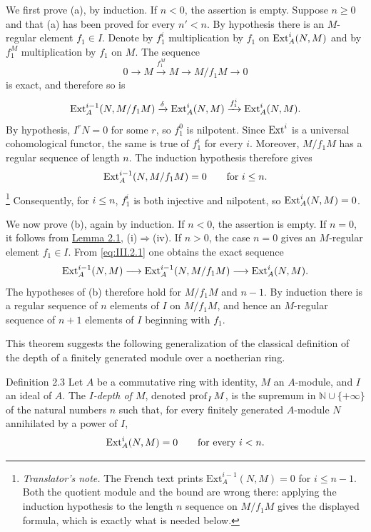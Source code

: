 We first prove (a), by induction. If $n<0$, the assertion is empty. Suppose
$n\ge0$ and that (a) has been proved for every $n'<n$. By hypothesis there
is an $M$-regular element $f_1\in I$. Denote by $f_1^i$ multiplication by
$f_1$ on $\operatorname{Ext}_A^i(N,M)$ and by $f_1^M$ multiplication by $f_1$ on $M$.
The sequence
\begin{equation}\label{eq:III.2.1}
  0\longrightarrow M\xrightarrow{f_1^M}M\longrightarrow M/f_1M
  \longrightarrow0
\end{equation}
is exact, and therefore so is
\[
  \operatorname{Ext}_A^{i-1}(N,M/f_1M)\xrightarrow{\delta}\operatorname{Ext}_A^i(N,M)
  \xrightarrow{f_1^i}\operatorname{Ext}_A^i(N,M).
\]
By hypothesis, $I^rN=0$ for some $r$, so $f_1^0$ is nilpotent. Since
$\operatorname{Ext}^i$ is a universal cohomological functor, the same is true of
$f_1^i$ for every $i$. Moreover, $M/f_1M$ has a regular sequence of length
$n$. The induction hypothesis therefore gives
\[
  \operatorname{Ext}_A^{i-1}(N,M/f_1M)=0\qquad\text{for }i\le n.
\]
\footnote{\textit{Translator's note.} The French text prints
$\mathrm{Ext}_A^{i-1}(N,M)=0$ for $i\le n-1$. Both the quotient module and
the bound are wrong there: applying the induction hypothesis to the length
$n$ sequence on $M/f_1M$ gives the displayed formula, which is exactly what
is needed below.}
Consequently, for $i\le n$, $f_1^i$ is both injective and nilpotent, so
$\operatorname{Ext}_A^i(N,M)=0$.

We now prove (b), again by induction. If $n<0$, the assertion is
empty. If $n=0$, it follows from \hyperref[III.2.1]{Lemma 2.1}, (i)$\Rightarrow$(iv). If $n>0$,
the case $n=0$ gives an $M$-regular element $f_1\in I$. From
\eqref{eq:III.2.1} one obtains the exact sequence
\begin{equation}\label{eq:III.2.2}
  \operatorname{Ext}_A^{i-1}(N,M)\longrightarrow
  \operatorname{Ext}_A^{i-1}(N,M/f_1M)\longrightarrow\operatorname{Ext}_A^i(N,M).
\end{equation}
The hypotheses of (b) therefore hold for $M/f_1M$ and $n-1$. By induction
there is a regular sequence of $n$ elements of $I$ on $M/f_1M$, and hence
an $M$-regular sequence of $n+1$ elements of $I$ beginning with $f_1$.

This theorem suggests the following generalization of the classical
definition of the depth of a finitely generated module over a noetherian
ring.

\begin{sgastatement}{Definition 2.3}
Let $A$ be a commutative ring with identity, $M$ an $A$-module, and $I$ an
ideal of $A$. The \emph{$I$-depth of $M$}, denoted $\operatorname{prof}_I M$, is the
supremum in $\mathbb N\cup\{+\infty\}$ of the natural numbers $n$ such
that, for every finitely generated $A$-module $N$ annihilated by a power of
$I$,
\[
  \operatorname{Ext}_A^i(N,M)=0\qquad\text{for every }i<n.
\]
\end{sgastatement}

